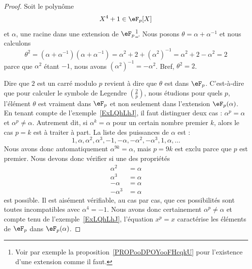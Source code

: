 \begin{proof}
	Soit le polynôme
	\begin{equation}
		X^4+1\in \eF_p[X]
	\end{equation}
	et \( \alpha\), une racine dans une extension de \( \eF_p\)\footnote{Voir par exemple la proposition~\ref{PROPooDPOYooFHcqkU} pour l'existence d'une extension comme il faut.}. Nous posons \( \theta=\alpha+\alpha^{-1}\) et nous calculons
	\begin{equation}
		\theta^2=(\alpha+\alpha^{-1})(\alpha+\alpha^{-1})=\alpha^2+2+(\alpha^2)^{-1}=\alpha^2+2-\alpha^2=2
	\end{equation}
	parce que \( \alpha^2\) étant \( -1\), nous avons \( (\alpha^2)^{-1}=-\alpha^2\). Bref, \( \theta^2=2\).

	Dire que \( 2\) est un carré modulo \( p\) revient à dire que \( \theta\) est dans \( \eF_p\). C'est-à-dire que pour calculer le symbole de Legendre \( \left(\frac{2}{p}\right)\), nous étudions pour quels \( p\), l'élément \( \theta\) est vraiment dans \( \eF_p\) et non seulement dans l'extension \( \eF_p(\alpha)\). En tenant compte de l'exemple~\ref{ExLQhLhJ}, il faut distinguer deux cas : \( \alpha^p=\alpha\) et \( \alpha^p\neq \alpha\). Autrement dit, si \( \alpha^k=\alpha\) pour un certain nombre premier \( k\), alors le cas \( p=k\) est à traiter à part. La liste des puissances de \( \alpha\) est :
	\begin{equation}
		1,\alpha,\alpha^2,\alpha^3,-1,-\alpha,-\alpha^2,-\alpha^3,1,\alpha,\ldots
	\end{equation}
	Nous avons donc automatiquement \( \alpha^{9k}=\alpha\), mais \( p=9k\) est exclu parce que \( p\) est premier. Nous devons donc vérifier si une des propriétés
	\begin{subequations}
		\begin{align}
			\alpha^2  & =\alpha \\
			\alpha^3  & =\alpha \\
			-\alpha   & =\alpha \\
			-\alpha^3 & =\alpha
		\end{align}
	\end{subequations}
	est possible. Il est aisément vérifiable, au cas par cas, que ces possibilités sont toutes incompatibles avec \( \alpha^4=-1\). Nous avons donc certainement \( \alpha^p\neq \alpha\) et compte tenu de l'exemple~\ref{ExLQhLhJ}, l'équation \( x^p=x\) caractérise les éléments de \( \eF_p\) dans \( \eF_p(\alpha)\).


\end{proof}
